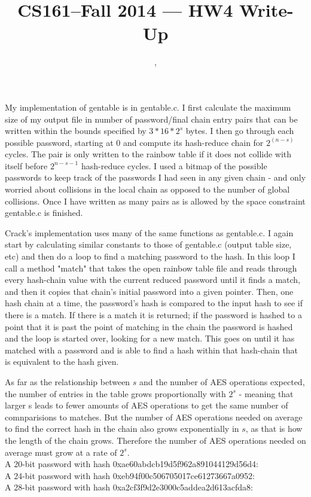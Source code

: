 \documentclass[11pt]{article}
\title{CS161--Fall 2014 --- HW4 Write-Up}
\author{\Name, \texttt{\Login}}
\begin{document}
\maketitle

My implementation of gentable is in gentable.c. I first calculate the maximum size of my output file in number of password/final chain entry pairs that can be written
within the bounds specified by $3 * 16 * 2^s$ bytes. I then go through each possible password, starting at 0 and compute its hash-reduce chain for $2^(n-s)$ cycles. The
pair is only written to the rainbow table if it does not collide with itself before $2^{n-s-1}$ hash-reduce cycles. I used a bitmap of the possible passwords to keep track
of the passwords I had seen in any given chain - and only worried about collisions in the local chain as opposed to the number of global collisions. Once I have written
as many pairs as is allowed by the space constraint gentable.c is finished.

Crack's implementation uses many of the same functions as gentable.c. I again start by calculating similar constants to those of gentable.c (output table size, etc) and then
do a loop to find a matching password to the hash. In this loop I call a method "match" that takes the open rainbow table file and reads through every hash-chain value with
the current reduced password until it finds a match, and then it copies that chain's initial password into a given pointer. Then, one hash chain at a time, the password's hash
is compared to the input hash to see if there is a match. If there is a match it is returned; if the password is hashed to a point that it is past the point of matching in the
chain the password is hashed and the loop is started over, looking for a new match. This goes on until it has matched with a password and is able to find a hash within that hash-chain
that is equivalent to the hash given.

As far as the relationship between $s$ and the number of AES operations expected, the number of entries in the table grows proportionally with $2^s$ - meaning that larger s leads to fewer
amounts of AES operations to get the same number of comnparisions to matches. But the number of AES operations needed on average to find the correct hash in the chain also grows
 exponentially in $s$, as that is how the length of the chain grows. Therefore the number of AES operations needed on average must grow at a rate of $2^s$.
\\[1 em]
A 20-bit password with hash 0xae60abdcb19d5f962a891044129d56d4:\\
A 24-bit password with hash 0xeb94f00c506705017ce61273667a0952:\\
A 28-bit password with hash 0xa2cf3f9d2e3000c5addea2d613acfda8:\\
\end{document}
